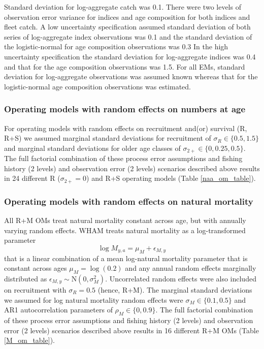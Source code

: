 \documentclass[
  12pt,
]{article}
\begin{document}
Standard deviation for log-aggregate catch was 0.1. There were two
levels of observation error variance for indices and age composition for
both indices and fleet catch. A low uncertainty specification assumed
standard deviation of both series of log-aggregate index observations
was 0.1 and the standard deviation of the logistic-normal for age
composition observations was 0.3 In the high uncertainty specification
the standard deviation for log-aggregate indices was 0.4 and that for
the age composition observations was 1.5. For all EMs, standard
deviation for log-aggregate observations was assumed known whereas that
for the logistic-normal age composition observations was estimated.

\hypertarget{operating-models-with-random-effects-on-numbers-at-age}{%
\subsubsection*{Operating models with random effects on numbers at
age}\label{operating-models-with-random-effects-on-numbers-at-age}}

For operating models with random effects on recruitment and(or) survival
(R, R+S) we assumed marginal standard deviations for recruitment of
\(\sigma_R \in \{0.5,1.5\}\) and marginal standard deviations for older
age classes of \(\sigma_{2+} \in \{0,0.25, 0.5\}\). The full factorial
combination of these process error assumptions and fishing history (2
levels) and observation error (2 levels) scenarios described above
results in 24 different R (\(\sigma_{2+} = 0\)) and R+S operating models
(Table \ref{naa_om_table}).

\hypertarget{operating-models-with-random-effects-on-natural-mortality}{%
\subsubsection*{Operating models with random effects on natural
mortality}\label{operating-models-with-random-effects-on-natural-mortality}}

All R+M OMs treat natural mortality constant across age, but with
annually varying random effects. WHAM treats natural mortality as a
log-transformed parameter \[
\log M_{y,a} = \mu_{M} + \epsilon_{M,y}
\] that is a linear combination of a mean log-natural mortality
parameter that is constant across ages \(\mu_{M} = \log(0.2)\) and any
annual random effects marginally distributed as
\(\epsilon_{M,y} \sim \text{N}\left(0,\sigma_M^2\right)\). Uncorrelated
random effects were also included on recruitment with \(\sigma_R = 0.5\)
(hence, R+M). The marginal standard deviations we assumed for log
natural mortality random effects were \(\sigma_M \in \{0.1, 0.5\}\) and
AR1 autocorrelation parameters of \(\rho_M \in \{0,0.9\}\). The full
factorial combination of these process error assumptions and fishing
history (2 levels) and observation error (2 levels) scenarios described
above results in 16 different R+M OMs (Table \ref{M_om_table}).
\end{document}
